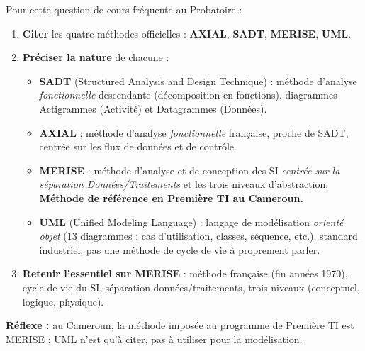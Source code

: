 \documentclass[11pt]{article}
\begin{document}
\begin{methode}
Pour cette question de cours fréquente au Probatoire :
\begin{enumerate}
\item \textbf{Citer} les quatre méthodes officielles : \textbf{AXIAL}, \textbf{SADT}, \textbf{MERISE}, \textbf{UML}.
\item \textbf{Préciser la nature} de chacune :
      \begin{itemize}
      \item \textbf{SADT} (Structured Analysis and Design Technique) : méthode d'analyse \emph{fonctionnelle} descendante (décomposition en fonctions), diagrammes Actigrammes (Activité) et Datagrammes (Données).
      \item \textbf{AXIAL} : méthode d'analyse \emph{fonctionnelle} française, proche de SADT, centrée sur les flux de données et de contrôle.
      \item \textbf{MERISE} : méthode d'analyse et de conception des SI \emph{centrée sur la séparation Données/Traitements} et les trois niveaux d'abstraction. \textbf{Méthode de référence en Première TI au Cameroun.}
      \item \textbf{UML} (Unified Modeling Language) : langage de modélisation \emph{orienté objet} (13 diagrammes : cas d'utilisation, classes, séquence, etc.), standard industriel, pas une méthode de cycle de vie à proprement parler.
      \end{itemize}
\item \textbf{Retenir l'essentiel sur MERISE} : méthode française (fin années 1970), cycle de vie du SI, séparation données/traitements, trois niveaux (conceptuel, logique, physique).
\end{enumerate}
\textbf{Réflexe :} au Cameroun, la méthode imposée au programme de Première TI est MERISE ; UML n'est qu'à citer, pas à utiliser pour la modélisation.
\end{methode}
\end{document}
